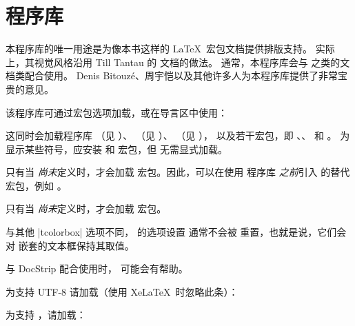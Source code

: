 \clearpage
\section{程序库 }\label{sec:documentation}%
%
本程序库的唯一用途是为像本书这样的 \LaTeX\ 宏包文档提供排版支持。
实际上，其视觉风格沿用 Till Tantau 的 
\cite{tantau:tikz_and_pgf} 文档的做法。
通常，本程序库会与  之类的文档类配合使用。
Denis Bitouz\'e、周宇恺以及其他许多人为本程序库提供了非常宝贵的意见。

该程序库可通过宏包选项加载，或在导言区中使用：
\begin{dispListing}
\end{dispListing}
这同时会加载程序库 （见 ）、
（见 ）、
（见 ），
以及若干宏包，即
、、 和 。
为显示某些符号，应安装  和  宏包，但
无需显式加载。

\begin{marker}
只有当  \emph{尚未}定义时，才会加载
 宏包。因此，可以在使用  程序库
\emph{之前}引入  的替代宏包，例如 。
\end{marker}
\begin{marker}
只有当  \emph{尚未}定义时，才会加载
 宏包。
\end{marker}
\begin{marker}
与其他 |tcolorbox| 选项不同， 的选项设置
通常不会被  重置，也就是说，它们会对
嵌套的文本框保持其取值。
\end{marker}
\begin{marker}
与 DocStrip 配合使用时， 可能会有帮助。
\end{marker}

为支持 UTF-8 请加载（使用 Xe\LaTeX\ 时忽略此条）：
\begin{dispListing}
\end{dispListing}

为支持  \cite{poore:minted}，请加载：
\begin{dispListing}
\end{dispListing}


